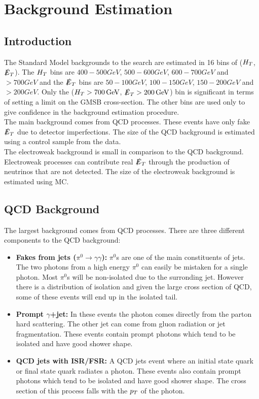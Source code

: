 \chapter{Background Estimation}

\section{Introduction}

The Standard Model backgrounds to the search are estimated in 16 bins of ($H_{T}$,
$\slashed{E}_{T}$). The $H_{T}$ bins are $400-500\unit{GeV}$, $500-600\unit{GeV}$,
$600-700\unit{GeV}$ and $>700\unit{GeV}$ and the $\slashed{E}_{T}$ bins are
$50-100\unit{GeV}$, $100-150\unit{GeV}$, $150-200\unit{GeV}$ and
$>200\unit{GeV}$. Only the ($H_{T}>700\, \mathrm{GeV}$, $\slashed{E}_{T}>200\, \mathrm{GeV}$) bin is
significant in terms of setting a limit on the GMSB cross-section. The other
bins are used only to give confidence in the background estimation procedure. \\

The main background comes from QCD processes. These events have only fake $\slashed{E}_{T}$
due to detector imperfections. The size of the QCD background is estimated using 
a control sample from the data. \\

The electroweak background is small in comparison to the QCD background.
Electroweak processes can contribute real $\slashed{E}_{T}$ through the production of
neutrinos that are not detected. The size of the electroweak background is 
estimated using MC.

\section{QCD Background}
\label{sec:QCD_Background}

The largest background comes from QCD processes. There are three different 
components to the QCD background:

\begin{itemize}
\item {\bf Fakes from jets ($\pi^{0}\rightarrow\gamma\gamma$):} $\pi^{0}$s are
one of the main constituents of jets. The two photons from a high energy 
$\pi^{0}$ can easily be mistaken for a single photon. Most $\pi^{0}$s will be 
non-isolated due to the surronding jet. However there is a distribution of 
isolation and given the large cross section of QCD, some of these events will 
end up in the isolated tail.
\item {\bf Prompt $\gamma$+jet:} In these events the photon comes directly from
the parton hard scattering. The other jet can come from gluon radiation or
jet fragmentation. These events contain prompt photons which tend to be isolated
and have good shower shape.
\item {\bf QCD jets with ISR/FSR:} A QCD jets event where an initial state quark
or final state quark radiates a photon. These events also contain prompt photons
which tend to be isolated and have good shower shape. The cross section of this 
process falls with the $p_{T}$ of the photon. 
\end{itemize}

